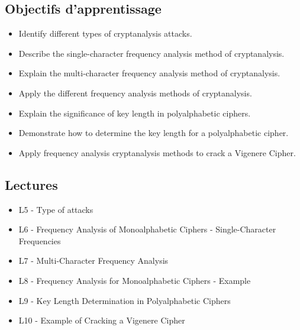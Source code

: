 \subsection*{Objectifs d'apprentissage}

\begin{itemize}[label={$\bullet$}]
    \item Identify different types of cryptanalysis attacks.
    \item Describe the single-character frequency analysis method of cryptanalysis.
    \item Explain the multi-character frequency analysis method of cryptanalysis.
    \item Apply the different frequency analysis methods of cryptanalysis.
    \item Explain the significance of key length in polyalphabetic ciphers.
    \item Demonstrate how to determine the key length for a polyalphabetic cipher.
    \item Apply frequency analysis cryptanalysis methods to crack a Vigenere Cipher.
\end{itemize}

\subsection*{Lectures}


\begin{itemize}[label={$\bullet$}]
    \item L5 - Type of attacks
    \item L6 - Frequency Analysis of Monoalphabetic Ciphers - Single-Character Frequencies
    \item L7 - Multi-Character Frequency Analysis
    \item L8 - Frequency Analysis for Monoalphabetic Ciphers - Example
    \item L9 - Key Length Determination in Polyalphabetic Ciphers
    \item L10 - Example of Cracking a Vigenere Cipher
\end{itemize}

\newpage


